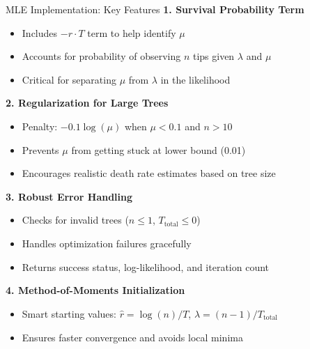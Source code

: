 \documentclass{beamer}
\begin{document}
\begin{frame}{MLE Implementation: Key Features}
    \textbf{1. Survival Probability Term}
    \begin{itemize}
        \item Includes $-r \cdot T$ term to help identify $\mu$
        \item Accounts for probability of observing $n$ tips given $\lambda$ and $\mu$
        \item Critical for separating $\mu$ from $\lambda$ in the likelihood
    \end{itemize}
    
    \vspace{0.3cm}
    \textbf{2. Regularization for Large Trees}
    \begin{itemize}
        \item Penalty: $-0.1 \log(\mu)$ when $\mu < 0.1$ and $n > 10$
        \item Prevents $\mu$ from getting stuck at lower bound (0.01)
        \item Encourages realistic death rate estimates based on tree size
    \end{itemize}
    
    \vspace{0.3cm}
    \textbf{3. Robust Error Handling}
    \begin{itemize}
        \item Checks for invalid trees ($n \leq 1$, $T_{\text{total}} \leq 0$)
        \item Handles optimization failures gracefully
        \item Returns success status, log-likelihood, and iteration count
    \end{itemize}
    
    \vspace{0.3cm}
    \textbf{4. Method-of-Moments Initialization}
    \begin{itemize}
        \item Smart starting values: $\hat{r} = \log(n)/T$, $\hat{\lambda} = (n-1)/T_{\text{total}}$
        \item Ensures faster convergence and avoids local minima
    \end{itemize}
\end{frame}
\end{document}
